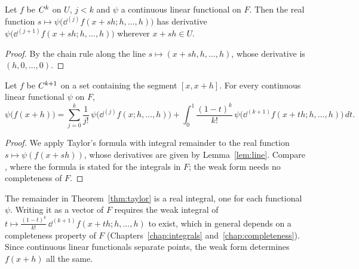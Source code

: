\begin{lemma}
  \label{lem:line}
  \leanok
  Let $f$ be $C^{k}$ on $U$, $j < k$ and $\psi$ a continuous linear functional on $F$. Then
  the real function $s \mapsto \psi\bigl(\dd^{(j)} f(x + sh; h, \dots, h)\bigr)$ has derivative
  $\psi\bigl(\dd^{(j+1)} f(x + sh; h, \dots, h)\bigr)$ wherever $x + sh \in U$.
\end{lemma}

\begin{proof}
  \leanok
  By the chain rule along the line $s \mapsto (x + sh, h, \dots, h)$, whose derivative is
  $(h, 0, \dots, 0)$.
\end{proof}

\begin{theorem}
  \label{thm:taylor}
  \leanok
  Let $f$ be $C^{k+1}$ on a set containing the segment $[x, x+h]$. For every continuous linear
  functional $\psi$ on $F$,
  \[
    \psi\bigl(f(x + h)\bigr) = \sum_{j=0}^{k} \frac{1}{j!}\,
      \psi\bigl(\dd^{(j)} f(x; h, \dots, h)\bigr)
      + \int_0^1 \frac{(1-t)^k}{k!}\,
      \psi\bigl(\dd^{(k+1)} f(x + th; h, \dots, h)\bigr)\, dt .
  \]
\end{theorem}

\begin{proof}
  \leanok
  We apply Taylor's formula with integral remainder to the real function
  $s \mapsto \psi(f(x + sh))$, whose derivatives are given by Lemma~\ref{lem:line}. Compare
  \cite[1.6.1 and 1.6.14]{GN26}, where the formula is stated for the integrals in $F$; the weak form
  needs no completeness of $F$.
\end{proof}

\begin{remark}
  The remainder in Theorem~\ref{thm:taylor} is a real integral, one for each functional $\psi$.
  Writing it as a vector of $F$ requires the weak integral of
  $t \mapsto \frac{(1-t)^k}{k!}\,\dd^{(k+1)} f(x + th; h, \dots, h)$ to exist, which in general
  depends on a completeness property of $F$ (Chapters~\ref{chap:integrals}
  and~\ref{chap:completeness}). Since continuous linear functionals separate points, the weak
  form determines $f(x + h)$ all the same.
\end{remark}

